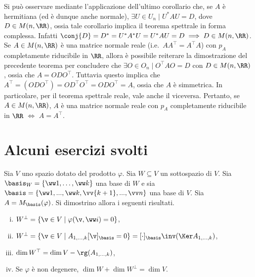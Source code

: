 \begin{remark}\nl
	\li Si può osservare mediante l'applicazione dell'ultimo corollario che, se $A$ è hermitiana (ed è dunque
	anche normale),
	$\exists U \in U_n \mid U^* A U = D$, dove $D \in M(n, \RR)$, ossia tale
	corollario implica il teorema spettrale in forma complessa. Infatti
	$\conj{D} = D^* = U^* A^* U = U^* A U = D \implies D \in M(n, \RR)$. \\
	
	\li Se $A \in M(n, \RR)$ è una matrice normale reale (i.e.~$A A^\top = A^\top A$) con
	$p_A$ completamente riducibile in $\RR$, allora è possibile reiterare la dimostrazione
	del precedente teorema per concludere che $\exists O \in O_n \mid O^\top A O = D$ con
	$D \in M(n, \RR)$, ossia che $A = O D O^\top$.
	Tuttavia questo implica che $A^\top = (O D O^\top) = O D^\top O^\top = O D O^\top = A$,
	ossia che $A$ è simmetrica. In particolare, per il teorema spettrale reale, vale
	anche il viceversa. Pertanto, se $A \in M(n, \RR)$, $A$ è una matrice normale reale con $p_A$ completamente
	riducibile in $\RR$ $\iff$ $A = A^\top$.
\end{remark}

\section{Alcuni esercizi svolti}

\begin{exercise}
	Sia $V$ uno spazio dotato del prodotto $\varphi$. Sia
	$W \subseteq V$ un sottospazio di $V$. Sia $\basis_W= \{ \ww 1, \ldots, \ww k \}$
	una base di $W$ e sia $\basis = \{ \ww 1, ..., \ww k, \vv{k+1}, ..., \vv n \}$ una base di $V$.
	Sia $A = M_\basis(\varphi)$. Si dimostrino allora i seguenti risultati.
	
	\begin{enumerate}[(i)]
		\item $W^\perp = \{ \v \in V \mid \varphi(\v, \ww i) = 0 \}$,
		\item $W^\perp = \{ \v \in V \mid A_{1,\ldots,k} [\v]_\basis = 0 \} = [\cdot]_\basis\inv (\Ker A_{1,\ldots,k})$,
		\item $\dim W^\top = \dim V - \rg(A_{1,\ldots,k})$,
		\item Se $\varphi$ è non degenere, $\dim W + \dim W^\perp = \dim V$.
	\end{enumerate}
\end{exercise}

